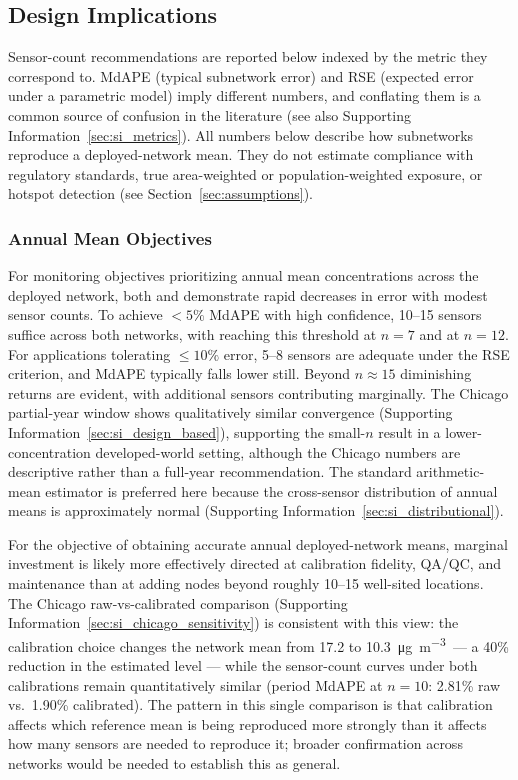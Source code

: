 \documentclass[12pt]{article}
\theoremstyle{remark}
\newcommand{\units}{\si{\micro\gram\per\cubic\meter}}
\newcommand{\city}[1]{\capitalisewords{\MakeLowercase{#1}}}
\begin{document}
\subsection{Design Implications}\label{sec:design_implications}

Sensor-count recommendations are reported below indexed by the metric they correspond to. MdAPE (typical subnetwork error) and RSE (expected error under a parametric model) imply different numbers, and conflating them is a common source of confusion in the literature (see also Supporting Information~\ref{sec:si_metrics}). All numbers below describe how subnetworks reproduce a deployed-network mean. They do not estimate compliance with regulatory standards, true area-weighted or population-weighted exposure, or hotspot detection (see Section~\ref{sec:assumptions}).

\subsubsection{Annual Mean Objectives}

For monitoring objectives prioritizing annual mean concentrations across the deployed network, both \city{Dhaka} and \city{Lucknow} demonstrate rapid decreases in error with modest sensor counts. To achieve $<5\%$ MdAPE with high confidence, 10--15 sensors suffice across both networks, with \city{Dhaka} reaching this threshold at $n=7$ and \city{Lucknow} at $n=12$. For applications tolerating $\le 10\%$ error, 5--8 sensors are adequate under the RSE criterion, and MdAPE typically falls lower still. Beyond $n \approx 15$ diminishing returns are evident, with additional sensors contributing marginally. The Chicago partial-year window shows qualitatively similar convergence (Supporting Information~\ref{sec:si_design_based}), supporting the small-$n$ result in a lower-concentration developed-world setting, although the Chicago numbers are descriptive rather than a full-year recommendation. The standard arithmetic-mean estimator is preferred here because the cross-sensor distribution of annual means is approximately normal (Supporting Information~\ref{sec:si_distributional}).

For the objective of obtaining accurate annual deployed-network means, marginal investment is likely more effectively directed at calibration fidelity, QA/QC, and maintenance than at adding nodes beyond roughly 10--15 well-sited locations. The Chicago raw-vs-calibrated comparison (Supporting Information~\ref{sec:si_chicago_sensitivity}) is consistent with this view: the calibration choice changes the network mean from 17.2 to 10.3~\units\ --- a 40\% reduction in the estimated level --- while the sensor-count curves under both calibrations remain quantitatively similar (period MdAPE at $n=10$: 2.81\% raw vs.\ 1.90\% calibrated). The pattern in this single comparison is that calibration affects which reference mean is being reproduced more strongly than it affects how many sensors are needed to reproduce it; broader confirmation across networks would be needed to establish this as general.
\end{document}
